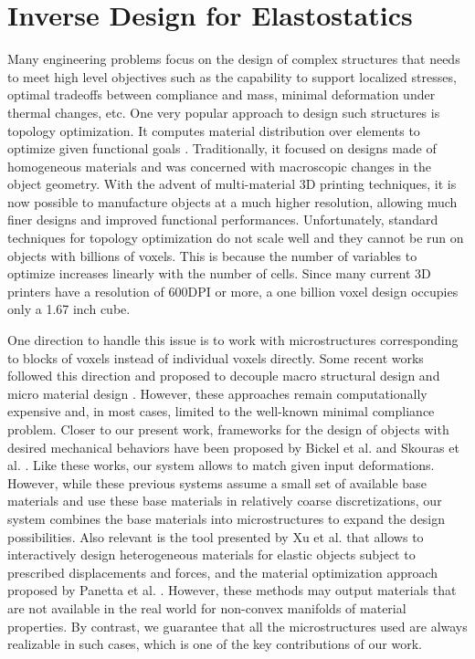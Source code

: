 \section{Inverse Design for Elastostatics}
Many engineering problems focus on the design of complex structures that needs to meet high level objectives such as the capability to support localized stresses, optimal tradeoffs between compliance and mass, minimal deformation under thermal changes, etc. One very popular approach to design such structures is topology optimization. It computes material distribution over elements to optimize given functional goals \cite{bendsoe2004topology}. Traditionally, it focused on designs made of homogeneous materials and was concerned with macroscopic changes in the object geometry.
With the advent of multi-material 3D printing techniques, it is now possible to manufacture objects at a much higher resolution, allowing much finer designs and improved functional performances.
Unfortunately, standard techniques for topology optimization do not scale well and they cannot be run on objects with billions of voxels. This is because the number of variables to optimize increases linearly with the number of cells. Since many current 3D printers have a resolution of 600DPI or more, a one billion voxel design occupies only a 1.67 inch cube.

One direction to handle this issue is to work with microstructures corresponding to blocks of voxels instead of individual voxels directly. Some recent works followed this direction and proposed to decouple macro structural design and micro material design \cite{rodrigues:2002:hierarchical,coelho:2008:hierarchical,nakshatrala:2013:nonlinear}. However, these approaches remain computationally expensive and, in most cases, limited to the well-known minimal compliance problem.
Closer to our present work, frameworks for the design of objects with desired mechanical behaviors have been proposed by Bickel et al. \cite{Bickel:2010:DAF} and Skouras et al. \cite{Skouras13Computational}. Like these works, our system  allows to match given input deformations. However, while these previous systems assume a small set of available base materials and use these base materials in relatively coarse discretizations, our system combines the base materials into microstructures to expand the design possibilities. Also relevant is the tool presented by Xu et al. \cite{xu:2015:interactive} that allows to interactively design heterogeneous materials for elastic objects subject to prescribed displacements and forces, and the material optimization approach proposed by Panetta et al. \cite{Panetta:2015}. However, these methods may output materials that are not available in the real world for non-convex manifolds of material properties. By contrast, we guarantee that all the microstructures used are always realizable in such cases, which is one of the key contributions of our work. 